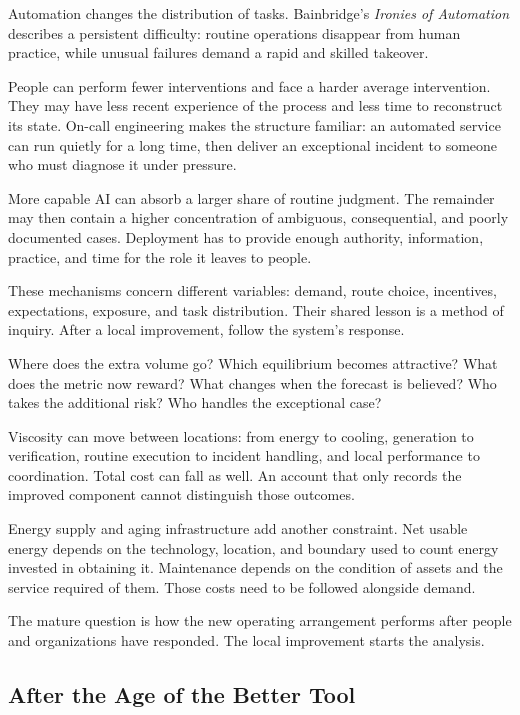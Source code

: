 Automation changes the distribution of tasks. Bainbridge's \emph{Ironies of Automation} describes a persistent difficulty: routine operations disappear from human practice, while unusual failures demand a rapid and skilled takeover.\cite{bainbridge1983ironies}

People can perform fewer interventions and face a harder average intervention. They may have less recent experience of the process and less time to reconstruct its state. On-call engineering makes the structure familiar: an automated service can run quietly for a long time, then deliver an exceptional incident to someone who must diagnose it under pressure.

More capable AI can absorb a larger share of routine judgment. The remainder may then contain a higher concentration of ambiguous, consequential, and poorly documented cases. Deployment has to provide enough authority, information, practice, and time for the role it leaves to people.


These mechanisms concern different variables: demand, route choice, incentives, expectations, exposure, and task distribution. Their shared lesson is a method of inquiry. After a local improvement, follow the system's response.

Where does the extra volume go? Which equilibrium becomes attractive? What does the metric now reward? What changes when the forecast is believed? Who takes the additional risk? Who handles the exceptional case?

Viscosity can move between locations: from energy to cooling, generation to verification, routine execution to incident handling, and local performance to coordination. Total cost can fall as well. An account that only records the improved component cannot distinguish those outcomes.

Energy supply and aging infrastructure add another constraint. Net usable energy depends on the technology, location, and boundary used to count energy invested in obtaining it. Maintenance depends on the condition of assets and the service required of them. Those costs need to be followed alongside demand.

The mature question is how the new operating arrangement performs after people and organizations have responded. The local improvement starts the analysis.

\subsection{After the Age of the Better Tool}

